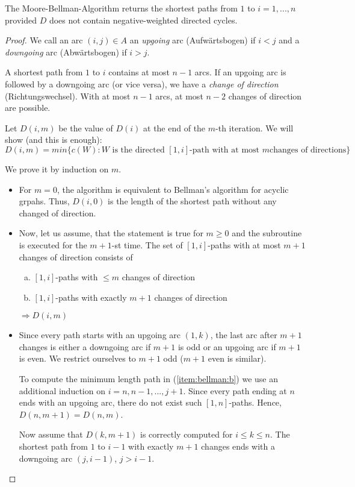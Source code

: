 \begin{thm} %
The Moore-Bellman-Algorithm returns the shortest paths from $1$ to $i = 1,
..., n$ provided $D$ does not contain negative-weighted directed cycles.
\end{thm}
\begin{proof}
We call an arc $(i, j) \in A$ an \emph{upgoing} arc (Aufwärtsbogen) if $i < j$ and a
\emph{downgoing} arc (Abwärtsbogen) if $i > j$.

A shortest path from $1$ to $i$ contains at most $n-1$ arcs. If an upgoing
arc is followed by a downgoing arc (or vice versa), we have a \emph{change
of direction} (Richtungswechsel). With at most $n-1$ arcs, at most $n-2$
changes of direction are possible.

Let $D(i, m)$ be the value of $D(i)$ at the end of the $m$-th iteration.
We will show (and this is enough):
\[ D(i, m) = min \{ c(W): \textrm{$W$ is the directed $[1,i]$-path with at most $m$
changes of directions} \} \]

We prove it by induction on $m$.

\begin{itemize}
\item For $m = 0$, the algorithm is equivalent to Bellman's algorithm for acyclic
grpahs. Thus, $D(i, 0)$ is the length of the shortest path without any
changed of direction.

\item Now, let us assume, that the statement is true for $m \geq 0$ and the
subroutine is executed for the $m+1$-st time. The set of $[1,i]$-paths with
at most $m+1$ changes of direction consists of 
\begin{enumerate}[(a)]
\item\label{item:bellman:a} $[1,i]$-paths with $\leq m$ changes of direction
\item\label{item:bellman:b} $[1,i]$-paths with exactly $m+1$ changes of direction
\end{enumerate}
$\Rightarrow D(i, m)$

\item Since every path starts with an upgoing arc $(1, k)$, the last arc
after $m+1$ changes is either a downgoing arc if $m+1$ is odd or an upgoing
arc if $m+1$ is even. We restrict ourselves to $m+1$ odd ($m+1$ even is
similar).

To compute the minimum length path in (\ref{item:bellman:b}) we use an
additional induction on $i= n, n-1, ..., j+1$. Since every path ending at
$n$ ends with an upgoing arc, there do not exist such $[1,n]$-paths.
Hence, $D(n, m+1) = D(n, m)$.

Now assume that $D(k, m+1)$ is correctly computed for $i \leq k \leq n$. The
shortest path from $1$ to $i-1$ with exactly $m+1$ changes ends with a
downgoing arc $(j, i-1)$, $j > i-1$.
\end{itemize}
\end{proof}

